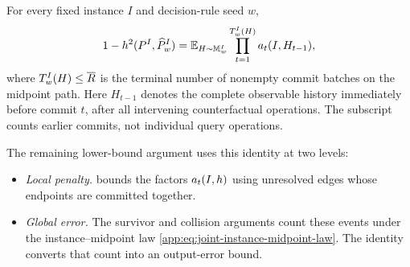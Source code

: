 \begin{lemma}
\label{app:lem:adaptive-midpoint-lower}
For every fixed instance \(I\) and decision-rule seed \(w\),
\begin{equation}
 1-\sqHellinger(
      \HardTargetLaw{I},\HardOutputLaw{I}{w})
 =\mathbb E_{H\sim\HardMidpointLaw{I}{w}}
   \prod_{t=1}^{\HardTerminalRoundCount{I}{w}{H}}
    \HardLocalAffinity{t}{I,H_{t-1}},
 \label{app:eq:adaptive-midpoint-identity}
\end{equation}
where \(\HardTerminalRoundCount{I}{w}{H}\le \RoundBudget{}\) is the terminal number of
nonempty commit batches on the midpoint path.
Here \(H_{t-1}\) denotes the complete observable history immediately
before commit \(t\), after all intervening counterfactual operations.
The subscript counts earlier commits, not individual query operations.
\end{lemma}

The remaining lower-bound argument uses this identity at two levels:
\begin{itemize}
\item \emph{Local penalty.}  bounds the
factors \(\HardLocalAffinity{t}{I,h}\) using unresolved edges whose
endpoints are committed together.
\item \emph{Global error.} The survivor and collision arguments count
these events under the instance--midpoint law
\eqref{app:eq:joint-instance-midpoint-law}. The identity converts that
count into an output-error bound.
\end{itemize}

